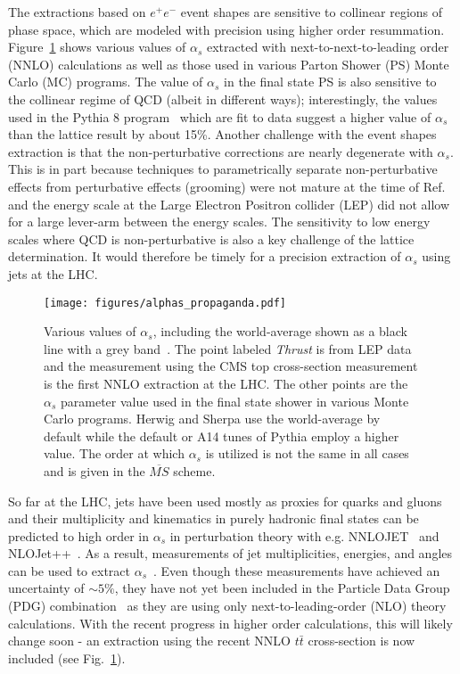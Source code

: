 The extractions based on $e^+e^-$ event shapes are sensitive to collinear regions of phase space, which are modeled with precision using higher order resummation.  Figure~\ref{fig:propaganda} shows various values of $\alpha_s$ extracted with next-to-next-to-leading order (NNLO) calculations as well as those used in various Parton Shower (PS) Monte Carlo (MC) programs.  The value of $\alpha_s$ in the final state PS is also sensitive to the collinear regime of QCD (albeit in different ways); interestingly, the values used in the Pythia 8 program~\cite{Sjostrand:2006za,Sjostrand:2007gs} which are fit to data suggest a higher value of $\alpha_s$ than the lattice result by about 15\%.   Another challenge with the event shapes extraction is that the non-perturbative corrections are nearly degenerate with $\alpha_s$.   This is in part because techniques to parametrically separate non-perturbative effects from perturbative effects (grooming) were not mature at the time of Ref.~\cite{Abbate:2010xh,Hoang:2015hka} and the energy scale at the Large Electron Positron collider (LEP) did not allow for a large lever-arm between the energy scales.   The sensitivity to low energy scales where QCD is non-perturbative is also a key challenge of the lattice determination.  It would therefore be timely for a precision extraction of $\alpha_s$ using jets at the LHC.

\begin{figure}
\begin{center}
\texttt{[image: figures/alphas\_propaganda.pdf]}
\end{center}
\caption{Various values of $\alpha_s$, including the world-average shown as a black line with a grey band~\cite{Olive:2016xmw}.  The point labeled \textit{Thrust} is from LEP data and the measurement using the CMS top cross-section measurement is the first NNLO extraction at the LHC.  The other points are the $\alpha_s$ parameter value used in the final state shower in various Monte Carlo programs.  Herwig and Sherpa use the world-average by default while the default or A14 tunes of Pythia employ a higher value.  The order at which $\alpha_s$ is utilized is not the same in all cases and is given in the $\overline{MS}$ scheme. }
\label{fig:propaganda}
\end{figure}

So far at the LHC, jets have been used mostly as proxies for quarks and gluons and their multiplicity and kinematics in purely hadronic final states can be predicted to high order in $\alpha_s$ in perturbation theory with e.g. NNLOJET~\cite{Currie:2016bfm,Currie:2017ctp} and NLOJet++~\cite{Nagy:2001fj,Nagy:2003tz}.  As a result, measurements of jet multiplicities, energies, and angles can be used to extract $\alpha_s$~\cite{ATLAS:2015yaa,Aaboud:2017fml,Khachatryan:2014waa,CMS:2014mna,Chatrchyan:2013txa}.   Even though these measurements have achieved an uncertainty of $\sim 5\%$, they have not yet been included in the Particle Data Group (PDG) combination~\cite{Olive:2016xmw} as they are using only next-to-leading-order (NLO) theory calculations.  With the recent progress in higher order calculations, this will likely change soon - an extraction using the recent NNLO $t\bar{t}$ cross-section is now included (see Fig.~\ref{fig:propaganda}).

